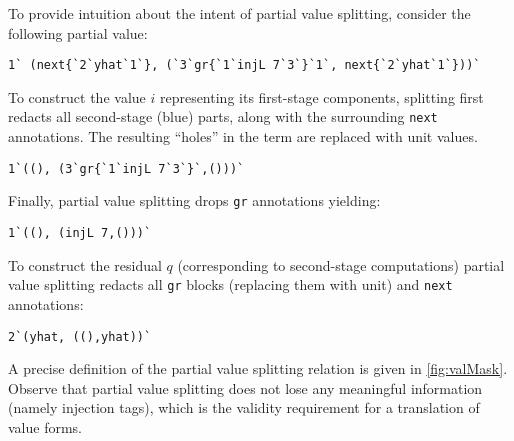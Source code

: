 \begin{abstrsyn}
To provide intuition about the intent of partial value splitting, consider the
following partial value:
\begin{lstlisting}
1` (next{`2`yhat`1`}, (`3`gr{`1`injL 7`3`}`1`, next{`2`yhat`1`}))`
\end{lstlisting}
To construct the value $i$ representing its first-stage components,
splitting first redacts all second-stage (blue) parts, along with the
surrounding \texttt{next} annotations. 
The resulting ``holes'' in the term are replaced with
unit values.
\begin{lstlisting}
1`((), (3`gr{`1`injL 7`3`}`,()))`
\end{lstlisting}
Finally, partial value splitting drops \texttt{gr} annotations yielding:
\begin{lstlisting}
1`((), (injL 7,()))`
\end{lstlisting}
To construct the residual $q$ (corresponding to second-stage computations) partial value splitting redacts all \texttt{gr} blocks
(replacing them with unit) and \texttt{next} annotations:
\begin{lstlisting}
2`(yhat, ((),yhat))`
\end{lstlisting}
A precise definition of the partial value splitting relation is given in
\ref{fig:valMask}.
Observe that partial value splitting does not lose any meaningful information (namely injection tags),
which is the validity requirement for a translation of value forms.





\end{abstrsyn}
